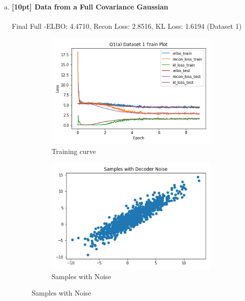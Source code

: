 \documentclass{article}
\begin{document}
\begin{enumerate}[(a)]

\item {\bf [10pt] Data from a Full Covariance Gaussian} \\\\
Final Full -ELBO: 4.4710, Recon Loss: 2.8516, KL Loss: 1.6194 (Dataset 1)
\begin{figure}[H]
    \centering
    \begin{subfigure}{0.32\textwidth}
        \centering
        \includegraphics[width=\textwidth]{figures/q1_a_dset1_train_plot.png}
        \caption{Training curve}
    \end{subfigure}
    \begin{subfigure}{0.32\textwidth}
        \centering
        \includegraphics[width=\textwidth]{figures/q1_a_dset1_sample_with_noise.png}
        \caption{Samples with Noise}
    \end{subfigure}

\end{figure}
\end{enumerate}
\end{document}
